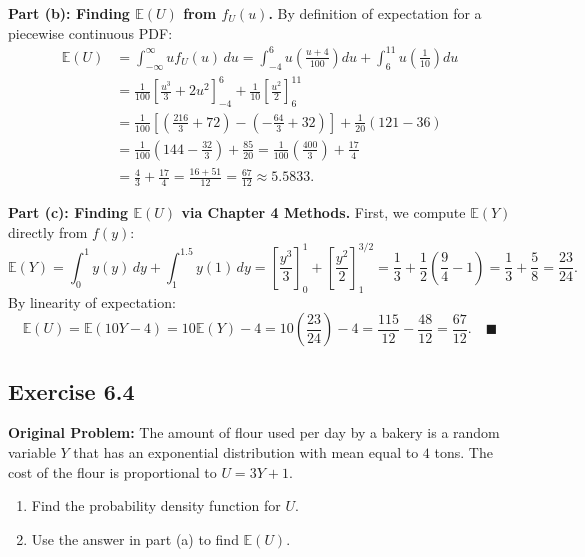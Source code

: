 \documentclass[11pt, letterpaper]{article}
\theoremstyle{definition}
\theoremstyle{remark}
\newcommand{\E}{\mathbb{E}}
\begin{document}
\textbf{Part (b): Finding $\E(U)$ from $f_U(u)$.}
By definition of expectation for a piecewise continuous PDF:
\begin{align*}
    \E(U) &= \int_{-\infty}^{\infty} u f_U(u)\,du = \int_{-4}^{6} u \left(\frac{u + 4}{100}\right) du + \int_{6}^{11} u \left(\frac{1}{10}\right) du \\
    &= \frac{1}{100} \left[ \frac{u^3}{3} + 2u^2 \right]_{-4}^{6} + \frac{1}{10} \left[ \frac{u^2}{2} \right]_{6}^{11} \\
    &= \frac{1}{100} \left[ \left(\frac{216}{3} + 72\right) - \left(-\frac{64}{3} + 32\right) \right] + \frac{1}{20} (121 - 36) \\
    &= \frac{1}{100} \left( 144 - \frac{32}{3} \right) + \frac{85}{20} = \frac{1}{100}\left(\frac{400}{3}\right) + \frac{17}{4} \\
    &= \frac{4}{3} + \frac{17}{4} = \frac{16 + 51}{12} = \frac{67}{12} \approx 5.5833.
\end{align*}

\textbf{Part (c): Finding $\E(U)$ via Chapter 4 Methods.}
First, we compute $\E(Y)$ directly from $f(y)$:
\[
    \E(Y) = \int_{0}^{1} y(y)\,dy + \int_{1}^{1.5} y(1)\,dy = \left[\frac{y^3}{3}\right]_{0}^{1} + \left[\frac{y^2}{2}\right]_{1}^{3/2} = \frac{1}{3} + \frac{1}{2}\left(\frac{9}{4} - 1\right) = \frac{1}{3} + \frac{5}{8} = \frac{23}{24}.
\]
By linearity of expectation:
\[
    \E(U) = \E(10Y - 4) = 10\E(Y) - 4 = 10\left(\frac{23}{24}\right) - 4 = \frac{115}{12} - \frac{48}{12} = \frac{67}{12}. \quad \blacksquare
\]

\subsection{Exercise 6.4}

\textbf{Original Problem:}
The amount of flour used per day by a bakery is a random variable $Y$ that has an exponential distribution with mean equal to $4$ tons. The cost of the flour is proportional to $U = 3Y + 1$.
\begin{enumerate}[label=\textbf{\alph*}]
    \item Find the probability density function for $U$.
    \item Use the answer in part (a) to find $\E(U)$.
\end{enumerate}

\hrulefill
\end{document}
